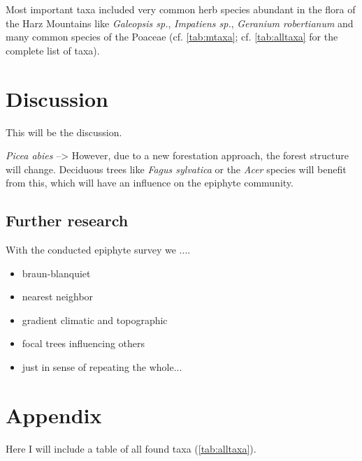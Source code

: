\documentclass[a4paper]{article}
\begin{document}
Most important taxa included very common herb species abundant in the flora of the Harz Mountains like \textit{Galeopsis sp.}, \textit{Impatiens sp.}, \textit{Geranium robertianum} and many common species of the Poaceae (cf. \autoref{tab:mtaxa}; cf. \autoref{tab:alltaxa} for the complete list of taxa).

\section{Discussion}

This will be the discussion.

\textit{Picea abies} -->  However, due to a new forestation approach, the forest structure will change. Deciduous trees like \textit{Fagus sylvatica} or the  \textit{Acer} species will benefit from this, which will have an influence on the epiphyte community.

\subsection{Further research}
With the conducted epiphyte survey we ....
\begin{itemize}
\item braun-blanquiet
\item nearest neighbor
\item gradient climatic and topographic
\item focal trees influencing others
\item just in sense of repeating the whole...
\end{itemize}

 
\section{Appendix}
\setcounter{table}{0}
\renewcommand{\thetable}{A-\arabic{table}}
Here I will include a table of all found taxa (\autoref{tab:alltaxa}).
\\
\end{document}
